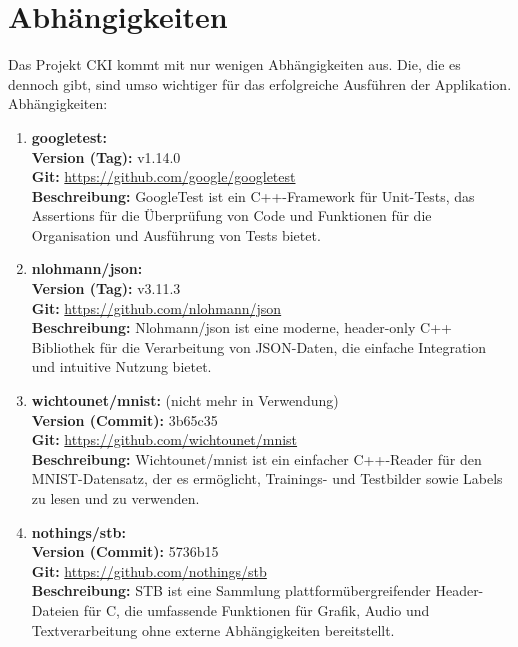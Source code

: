 \section{Abhängigkeiten}
\label{sec:RealAbhängigkeiten}
Das Projekt CKI kommt mit nur wenigen Abhängigkeiten aus.
Die, die es dennoch gibt, sind umso wichtiger für das erfolgreiche Ausführen der Applikation.
\\
Abhängigkeiten:
\begin{enumerate}
	\item \textbf{googletest:} \\
	\textbf{Version (Tag):} v1.14.0 \\
	\textbf{Git:} \url{https://github.com/google/googletest} \\
	\textbf{Beschreibung:} GoogleTest ist ein C++-Framework für Unit-Tests, das Assertions für die Überprüfung von Code und Funktionen für die Organisation und Ausführung von Tests bietet.

	\item \textbf{nlohmann/json:} \\
	\textbf{Version (Tag):} v3.11.3 \\
	\textbf{Git:} \url{https://github.com/nlohmann/json} \\
	\textbf{Beschreibung:} Nlohmann/json ist eine moderne, header-only C++ Bibliothek für die Verarbeitung von JSON-Daten, die einfache Integration und intuitive Nutzung bietet.

	\item \textbf{wichtounet/mnist:} (nicht mehr in Verwendung)\\
	\textbf{Version (Commit):} 3b65c35 \\
	\textbf{Git:} \url{https://github.com/wichtounet/mnist} \\
	\textbf{Beschreibung:} Wichtounet/mnist ist ein einfacher C++-Reader für den MNIST-Datensatz, der es ermöglicht, Trainings- und Testbilder sowie Labels zu lesen und zu verwenden.

	\item \textbf{nothings/stb:}\\
	\textbf{Version (Commit):} 5736b15 \\
	\textbf{Git:} \url{https://github.com/nothings/stb} \\
	\textbf{Beschreibung:} STB ist eine Sammlung plattformübergreifender Header-Dateien für C, die umfassende Funktionen für Grafik, Audio und Textverarbeitung ohne externe Abhängigkeiten bereitstellt. 
\end{enumerate}

